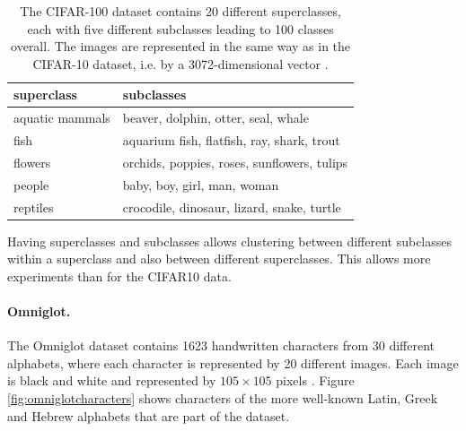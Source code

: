 \begin{table}[h]
    \centering
    \begin{tabular}{|l|l|}
    \hline
    superclass      & subclasses                                  \\ \hline
    aquatic mammals & beaver, dolphin, otter, seal, whale         \\
    fish            & aquarium fish, flatfish, ray, shark, trout  \\
    flowers         & orchids, poppies, roses, sunflowers, tulips \\
    people          & baby, boy, girl, man, woman                 \\ 
    reptiles        & crocodile, dinosaur, lizard, snake, turtle  \\ \hline               
    \end{tabular}
    \caption{The CIFAR-100 dataset contains 20 different superclasses, each with five different subclasses leading to 100 classes overall. The images are represented in the same way as in the CIFAR-10 dataset, i.e. by a 3072-dimensional vector \cite{Krizhevsky2009LearningML}.}
    \label{table:cifar100data}
\end{table}

Having superclasses and subclasses allows clustering between different subclasses within a superclass and also between different superclasses. This allows more experiments than for the CIFAR10 data.

\paragraph{Omniglot.}The Omniglot dataset contains 1623 handwritten characters from 30 different alphabets, where each character is represented by 20 different images. Each image is black and white and represented by $105 \times 105$ pixels \cite{Lake1332}. Figure \ref{fig:omniglotcharacters} shows characters of the more well-known Latin, Greek and Hebrew alphabets that are part of the dataset.


